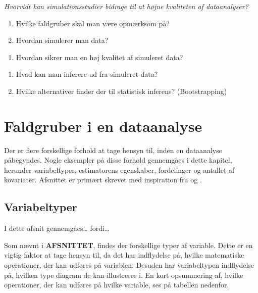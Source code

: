 \documentclass[]{book}
\providecommand{\tightlist}{%
  \setlength{\itemsep}{0pt}\setlength{\parskip}{0pt}}
\theoremstyle{definition}
\theoremstyle{definition}
\theoremstyle{definition}
\theoremstyle{remark}
\begin{document}
\emph{Hvorvidt kan simulationsstudier bidrage til at højne kvaliteten af dataanalyser?}

\begin{enumerate}
\def\labelenumi{\arabic{enumi}.}
\item
  Hvilke faldgruber skal man være opmærksom på?
\item
  Hvordan simulerer man data?
\end{enumerate}

\begin{enumerate}
\def\labelenumi{\alph{enumi}.}
\tightlist
\item
  Hvordan sikrer man en høj kvalitet af simuleret data?
\end{enumerate}

\begin{enumerate}
\def\labelenumi{\arabic{enumi}.}
\setcounter{enumi}{2}
\item
  Hvad kan man inferere ud fra simuleret data?
\item
  Hvilke alternativer finder der til statistisk inferens? (Bootstrapping)
\end{enumerate}

\hypertarget{faldgruber-i-en-dataanalyse}{%
\chapter{Faldgruber i en dataanalyse}\label{faldgruber-i-en-dataanalyse}}

Der er flere forskellige forhold at tage hensyn til, inden en dataanalyse påbegyndes. Nogle eksempler på disse forhold gennemgåes i dette kapitel, herunder variabeltyper, estimatorens egenskaber, fordelinger og antallet af kovariater. Afsnittet er primært skrevet med inspiration fra \citep{ASTAbog} og \citep{ASTAkursus3}.

\hypertarget{variabeltyper-1}{%
\section{Variabeltyper}\label{variabeltyper-1}}

I dette afsnit gennemgåes\ldots{} fordi\ldots{}

Som nævnt i \textbf{AFSNITTET}, findes der forskellige typer af variable. Dette er en vigtig faktor at tage hensyn til, da det har indflydelse på, hvilke matematiske operationer, der kan udføres på variablen. Desuden har variabeltypen indflydelse på, hvilken type diagram de kan illustreres i. En kort opsummering af, hvilke operationer, der kan udføres på hvilke variable, ses på tabellen nedenfor.
\end{document}
